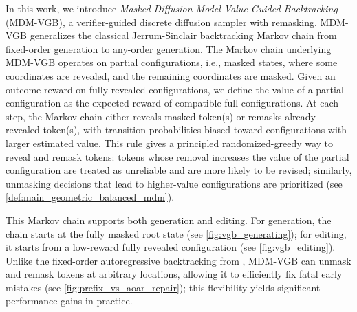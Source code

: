 \documentclass{article}
\numberwithin{theorem}{section}
\numberwithin{proposition}{section}
\numberwithin{corollary}{section}
\numberwithin{lemma}{section}
\numberwithin{conjecture}{section}
\numberwithin{remark}{section}
\numberwithin{definition}{section}
\numberwithin{assumption}{section}
\numberwithin{example}{section}
\begin{document}
In this work, we introduce \emph{Masked-Diffusion-Model Value-Guided Backtracking} (MDM-VGB), a verifier-guided discrete diffusion sampler with remasking. MDM-VGB generalizes the classical Jerrum-Sinclair backtracking Markov chain \citep{sinclair1989approximate} from fixed-order generation to any-order generation.
The Markov chain underlying MDM-VGB operates on partial configurations, i.e., masked states, where some coordinates are revealed, and the remaining coordinates are masked. Given an outcome reward on fully revealed configurations, we define the value of a partial configuration as the expected reward of compatible full configurations. 
At each step, the Markov chain either reveals masked token(s) or remasks already revealed token(s), with transition probabilities biased toward configurations with larger estimated value. This rule gives a principled randomized-greedy way to reveal and remask tokens: tokens whose removal increases the value of the partial configuration are treated as unreliable and are more likely to be revised; similarly, unmasking decisions that lead to higher-value configurations are prioritized (see \cref{def:main_geometric_balanced_mdm}).
 
This Markov chain supports both generation and editing. For generation, the chain starts at the fully masked root state (see \cref{fig:vgb_generating}); for editing, it starts from a low-reward fully revealed configuration (see \cref{fig:vgb_editing}). Unlike the fixed-order autoregressive backtracking from \cite{rohatgi2025taming},
MDM-VGB can unmask and remask tokens at arbitrary locations, allowing it to efficiently fix fatal early mistakes (see \cref{fig:prefix_vs_aoar_repair}); this flexibility yields significant performance gains in practice.
\end{document}
